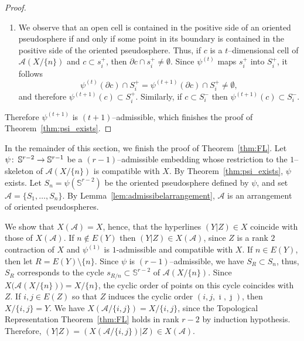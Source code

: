 \documentclass[a4paper]{amsart}
\def\co{\colon\thinspace}
\newcommand{\p}{\mathbb S}
\renewcommand{\d}{\partial}
\theoremstyle{definition}
\theoremstyle{remark}
\begin{document}
\begin{proof}
\begin{enumerate}
    There is some $x\in\mathbf E(X/T)\setminus \{n\}$, so that $X/T$
    induces the cyclic order $(n,x,\overline n, \overline x)$. Let
    $j=x^*$. Since $\psi^{(t)}$ is $t$--admissible, it follows from
    Lemma~\ref{lem:admissibelarrangement} that $\mathcal A(X\setminus
    \{n\})$ and $\psi^{(t+1)}(s_{R/n})$ induce on $S_{R\cup\{j\}}$ an
    arrangement of oriented pseudospheres. If $\gamma$ does not
    meet both connected components of $S_R\setminus
    \psi^{(t+1)}(s_{R/n})$, then the two points of $\gamma\cap S_j$ are
    contained in a single component of $S_{R\cup\{j\}}\setminus
    \psi^{(t+1)}(s_{R/n})$, which is impossible for arrangements of
    oriented pseudospheres. Hence, $\psi^{(t+1)}$ satisfies the second
    property in the definition of $(t+1)$--admissible embeddings.
  \item We observe that an open cell is contained in the positive side of an
    oriented pseu\-do\-sphe\-re if and only if some point in its boundary is
    contained in the positive side of the oriented pseudosphere.  Thus,
    if $c$ is a $t$--dimensional cell of $\mathcal A(X/\{n\})$ and
    $c\subset s_i^+$, then $\d c \cap s_i^+\not= \emptyset$. Since
    $\psi^{(t)}$ maps $s_i^+$ into $S_i^+$, it follows
    $$\psi^{(t)}(\d c) \cap S_i^+ = \psi^{(t+1)} (\d c)\cap S_i^+ \not=
    \emptyset,$$
    and therefore $\psi^{(t+1)}(c)\subset S_i^+$.
    Similarly, if $c\subset S_i^-$ then $\psi^{(t+1)}(c)\subset S_i^-$.
  \end{enumerate}
  Therefore $\psi^{(t+1)}$ is $(t+1)$--admissible, which finishes the
  proof of Theorem~\ref{thm:psi_exists}.
\end{proof}

In the remainder of this section, we finish the proof of
Theorem~\ref{thm:FL}. 
Let $\psi\co \p^{r-2}\to \p^{r-1}$ be a $(r-1)$--admissible embedding
whose restriction to the $1$--skeleton of $\mathcal A(X/\{n\})$ is
compatible with $X$. By Theorem~\ref{thm:psi_exists}, $\psi$ exists. 
Let $S_n=\psi(\p^{r-2})$ be the oriented  pseudosphere defined by $\psi$,
and set $\mathcal A = \{S_1,\dots,S_n\}$. 
By Lemma~\ref{lem:admissibelarrangement}, $\mathcal A$ is an arrangement
of oriented pseudospheres. 

We show that $X(\mathcal A) = X$, hence, that the hyperlines $(Y|Z)\in
X$ coincide with those of $X(\mathcal A)$.
If $n\not\in E(Y)$ then $(Y|Z)\in X(\mathcal A)$, since $Z$ is a rank
$2$ contraction of $X$ and $\psi^{(1)}$ is $1$-admissible and compatible
with $X$.  
If $n\in E(Y)$, then let $R=E(Y)\setminus \{n\}$. Since $\psi$ is
$(r-1)$--admissible, we have $S_R\subset S_n$, thus, $S_R$ corresponds
to the cycle $s_{R/n}\subset \p^{r-2}$ of $\mathcal A(X/\{n\})$. 
Since $X\big(\mathcal A(X/\{n\})\big)= X/\{n\}$, the cyclic order of
points on this cycle coincides with $Z$. If $i,j\in E(Z)$ so that $Z$
induces the cyclic order $(i,j,\overline \imath,\overline \jmath)$, then
$X/\{i,j\}=Y$. We have $X(\mathcal A/\{i,j\}) = X/\{i,j\}$, since 
the Topological Representation Theorem~\ref{thm:FL} holds in rank
$r-2$ by induction hypothesis. Therefore, $(Y|Z) = (X(\mathcal
A/\{i,j\})|Z)\in X(\mathcal A)$. 
\end{document}
